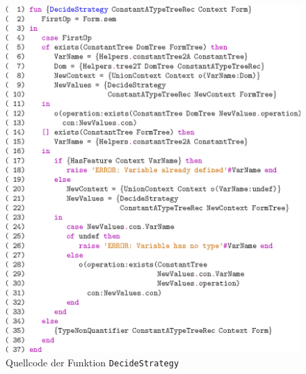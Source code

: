 \begin{figure}
\begin{center}
\includegraphics[scale=1.0]{eps/decide_n}
\end{center}
\caption{Quellcode der Funktion {\tt DecideStrategy}}
\label{DecideStrategyCode}
\end{figure}

